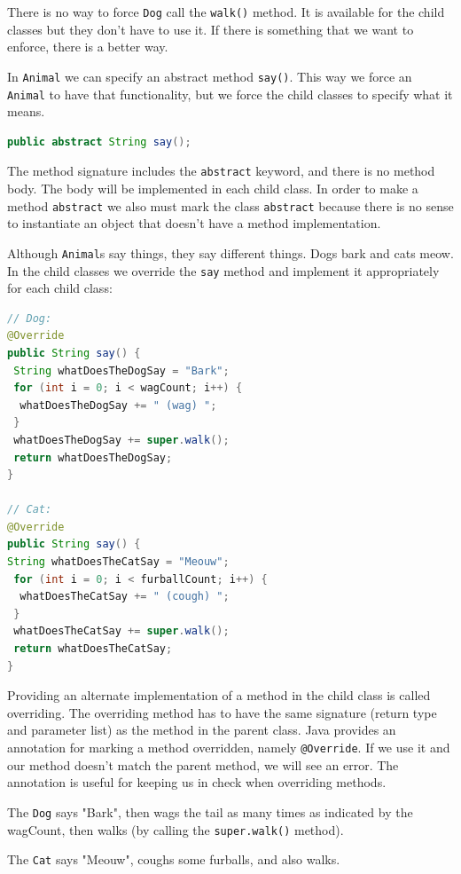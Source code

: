 There is no way to force \texttt{Dog} call the \texttt{walk()} method. It is available for the child classes but they don't have to use it. If there is something that we want to enforce, there is a better way.

In \texttt{Animal} we can specify an abstract method \texttt{say()}. This way we force an \texttt{Animal} to have that functionality, but we force the child classes to specify what it means. 
\begin{lstlisting}[language=Java]
public abstract String say();
\end{lstlisting}

The method signature includes the \texttt{abstract} keyword, and there is no method body. The body will be implemented in each child class. In order to make a method \texttt{abstract} we also must mark the class \texttt{abstract} because there is no sense to instantiate an object that doesn't have a method implementation.

Although \texttt{Animal}s say things, they say different things. Dogs bark and cats meow. In the child classes we override the \texttt{say} method and implement it appropriately for each child class:
\begin{lstlisting}[language=Java]
// Dog:
@Override
public String say() {
 String whatDoesTheDogSay = "Bark";
 for (int i = 0; i < wagCount; i++) {
  whatDoesTheDogSay += " (wag) ";
 }
 whatDoesTheDogSay += super.walk();
 return whatDoesTheDogSay;
}
  
// Cat:
@Override
public String say() {
String whatDoesTheCatSay = "Meouw";
 for (int i = 0; i < furballCount; i++) {
  whatDoesTheCatSay += " (cough) ";
 }
 whatDoesTheCatSay += super.walk();
 return whatDoesTheCatSay;
}
\end{lstlisting}
Providing an alternate implementation of a method in the child class is called overriding. The overriding method has to have the same signature (return type and parameter list) as the method in the parent class. Java provides an annotation for marking a method overridden, namely \texttt{@Override}. If we use it and our method doesn't match the parent method, we will see an error. The annotation is useful for keeping us in check when overriding methods.

The \texttt{Dog} says "Bark", then wags the tail as many times as indicated by the wagCount, then walks (by calling the \texttt{super.walk()} method).

The \texttt{Cat} says "Meouw", coughs some furballs, and also walks.

